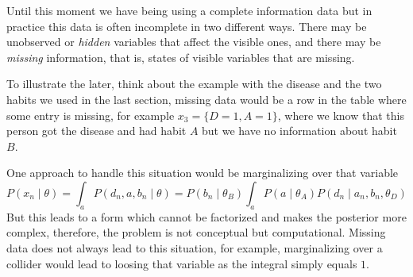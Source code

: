

Until this moment we have being using a complete information data but in practice this data is often incomplete in two different ways. There may be unobserved or \emph{hidden} variables that affect the visible ones, and there may be \emph{missing} information, that is, states of visible variables that are missing.

To illustrate the later, think about the example with the disease and the two habits we used in the last section, missing data would be a row in the table where some entry is missing, for example \(x_{3} = \{D = 1, A = 1\}\), where we know that this person got the disease and had habit \(A\) but we have no information about habit \(B\).

One approach to handle this situation would be marginalizing over that variable
\[
  P(x_{n} \mid \theta) = \int_{a}P(d_{n}, a, b_{n} \mid \theta) = P(b_{n} \mid \theta_{B})\int_{a}P(a \mid \theta_{A})P(d_{n} \mid a_{n}, b_{n}, \theta_{D})
\]
But this leads to a form which cannot be factorized and makes the posterior more complex, therefore, the problem is not conceptual but computational. Missing data does not always lead to this situation, for example, marginalizing over a collider would lead to loosing that variable as the integral simply equals \(1\).
